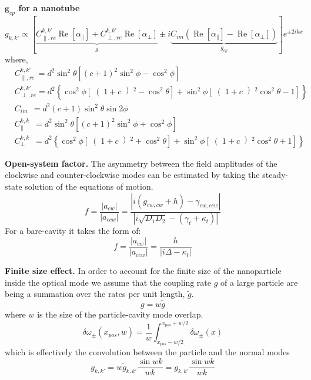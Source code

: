 \documentclass[journal=jacsat,manuscript=article]{achemso}
\begin{document}
\begin{suppinfo}
\textbf{$\mathbf{g}_{cp}$ for a nanotube}
\begin{equation*}
g_{k,k'} \propto \left[ \underbrace{C_{\parallel,re}^{k,k'} \operatorname{Re} \left[ \alpha_{\parallel} \right] + C_{\perp,re}^{k,k'} \operatorname{Re} \left[ \alpha_{\perp} \right]}_{g} \pm i \underbrace{C_{im} \left( \operatorname{Re} \left[ \alpha_{\parallel} \right] - \operatorname{Re} \left[ \alpha_{\perp} \right] \right)}_{g_{cp}} \right] e^{\pm 2 i k x} 
\end{equation*}
where,
\begin{align*}
&C_{\parallel,re}^{k,k'} \,= d^2 \sin^2{\theta} \left[(c+1)^2 \sin^2{\phi} - \cos^2{\phi}\right]\\
&C_{\perp,re}^{k,k'} = d^2 \left\{ \cos^2{\phi} \left[ \right( 1 + c \left)^2 - \cos^2{\theta} \right] + \sin^2{\phi} \left[ \right( 1 + c \left)^2 \cos^2{\theta} - 1 \right] \right\}\\
&C_{im} \ \: = d^2(c+1) \sin^2{\theta} \sin{2\phi}\\
&C_{\parallel}^{k,k} \;\:\! = d^2 \sin^2{\theta} \left[(c+1)^2 \sin^2{\phi} + \cos^2{\phi}\right]\\
&C_{\perp}^{k,k} \;\:\! = d^2 \left\{ \cos^2{\phi} \left[ \right( 1 + c \left)^2 + \cos^2{\theta} \right] + \sin^2{\phi} \left[ \right( 1 + c \left)^2 \cos^2{\theta} + 1 \right] \right\}
\end{align*}

\textbf{Open-system factor.} The asymmetry between the field amplitudes of the clockwise and counter-clockwise modes can be estimated by taking the steady-state solution of the equations of motion.
\begin{equation*}
f = \frac{\left| a_{cw} \right|}{\left| a_{ccw} \right|} =  \frac{\left| i\left( g_{cw,cw} + h\right) - \gamma_{cw,ccw}\right|}{\left| i \sqrt{D_1 D_2} - \left( \gamma_t + \kappa_t \right) \right|} 
\end{equation*}
For a bare-cavity it takes the form of:
\begin{equation*}
f = \frac{\left| a_{cw} \right|}{\left| a_{ccw} \right|} =  \frac{h}{\left| i \Delta - \kappa_t \right|} 
\end{equation*}

\textbf{Finite size effect.} In order to account for the finite size of the nanoparticle inside the optical mode we assume that the coupling rate $g$ of a large particle are being a summation over the rates per unit length, $\tilde{g}$.
\begin{equation*}
g = w\tilde{g}
\end{equation*}
where $w$ is the size of the particle-cavity mode overlap.
\begin{equation*}
\delta \omega_{\pm} \left(x_{pos}, w \right) = \frac{1}{w} \int_{x_{pos}-w/2}^{x_{pos}+w/2} \delta \omega_{\pm} \left(x \right)
\end{equation*}
which is effectively the convolution between the particle and the normal modes
\begin{equation*}
g_{k,k'} = w \tilde{g}_{k,k'} \frac{\sin{wk}}{wk} = g_{k,k'} \frac{\sin{wk}}{wk}
\end{equation*}

\end{suppinfo}
\end{document}
